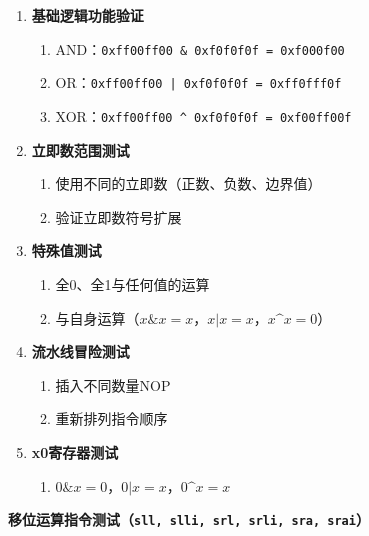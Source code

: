 \documentclass[12pt,a4paper]{ctexart}
\newcommand{\code}[1]{\texttt{#1}}
\begin{document}
\begin{enumerate}
    \item \textbf{基础逻辑功能验证}
    \begin{enumerate}
        \item AND：\texttt{0xff00ff00 \& 0xf0f0f0f = 0xf000f00}
        \item OR：\texttt{0xff00ff00 | 0xf0f0f0f = 0xff0fff0f}
        \item XOR：\texttt{0xff00ff00 \^{} 0xf0f0f0f = 0xf00ff00f}
    \end{enumerate}
    
    \item \textbf{立即数范围测试}
    \begin{enumerate}
        \item 使用不同的立即数（正数、负数、边界值）
        \item 验证立即数符号扩展
    \end{enumerate}
    
    \item \textbf{特殊值测试}
    \begin{enumerate}
        \item 全0、全1与任何值的运算
        \item 与自身运算（$x \& x = x$，$x | x = x$，$x \^{} x = 0$）
    \end{enumerate}
    
    \item \textbf{流水线冒险测试}
    \begin{enumerate}
        \item 插入不同数量NOP
        \item 重新排列指令顺序
    \end{enumerate}
    
    \item \textbf{x0寄存器测试}
    \begin{enumerate}
        \item $0 \& x = 0$，$0 | x = x$，$0 \^{} x = x$
    \end{enumerate}
\end{enumerate}

\textbf{移位运算指令测试（\code{sll, slli, srl, srli, sra, srai}）}
\end{document}
